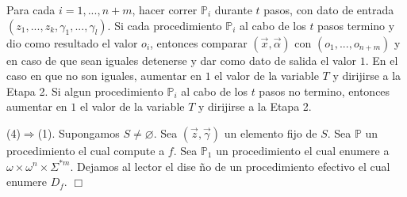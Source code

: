 Para cada \(i=1,...,n+m\), hacer correr \(\mathbb{P}_{i}\) durante \(t\) pasos, con dato de entrada \((z_{1},...,z_{k},\gamma _{1},...,\gamma _{l}).\) Si cada procedimiento \(\mathbb{P}_{i}\) al cabo de los \(t\) pasos termino y dio como resultado el valor \(o_{i}\), entonces comparar \((\vec{x},\vec{\alpha} )\) con \((o_{1},...,o_{n+m})\) y en caso de que sean iguales detenerse y dar como dato de salida el valor \(1\). En el caso en que no son iguales, aumentar en \(1\) el valor de la variable \(T\) y dirijirse a la Etapa 2. Si algun procedimiento \(\mathbb{P}_{i}\) al cabo de los \(t\) pasos no termino, entonces aumentar en \(1\) el valor de la variable \(T\) y dirijirse a la Etapa 2.

(4)\(\Rightarrow \)(1). Supongamos \(S\neq \varnothing .\) Sea \((\vec{z},\vec{ \gamma})\) un elemento fijo de \(S.\) Sea \(\mathbb{P}\) un procedimiento el cual compute a \(f\). Sea \(\mathbb{P}_{1}\) un procedimiento el cual enumere a \( \omega \times \omega ^{n}\times \Sigma ^{\ast m}.\) Dejamos al lector el dise \~{n}o de un procedimiento efectivo el cual enumere \(D_{f}\). \(\Box\)
